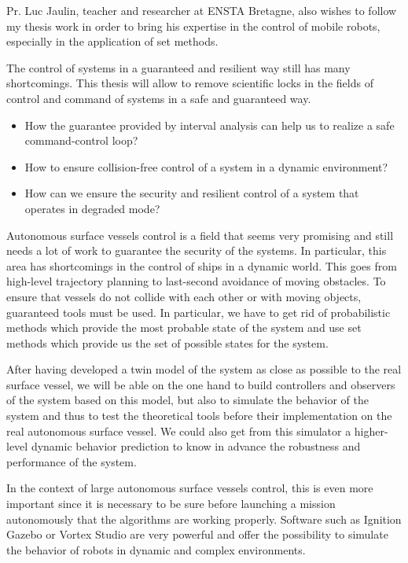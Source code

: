 \documentclass[11pt, a4paper]{awesome-cv}
\begin{document}
\begin{cvletter}
			Pr. Luc Jaulin, teacher and researcher at ENSTA Bretagne, also wishes to follow my thesis work in order to bring his expertise in the control of mobile robots, especially in the application of set methods. 
			

			The control of systems in a guaranteed and resilient way still has many shortcomings. This thesis will allow to remove scientific locks in the fields of control and command of systems in a safe and guaranteed way.

			\begin{itemize}[noitemsep,topsep=0pt,parsep=0pt,partopsep=0pt]
				\item How the guarantee provided by interval analysis can help us to realize a safe command-control loop?
				\item How to ensure collision-free control of a system in a dynamic environment?
				\item How can we ensure the security and resilient control of a system that operates in degraded mode?
			\end{itemize}


			Autonomous surface vessels control is a field that seems very promising and still needs a lot of work to guarantee the security of the systems. In particular, this area has shortcomings in the control of ships in a dynamic world. This goes from high-level trajectory planning to last-second avoidance of moving obstacles. To ensure that vessels do not collide with each other or with moving objects, guaranteed tools must be used. In particular, we have to get rid of probabilistic methods which provide the most probable state of the system and use set methods which provide us the set of possible states for the system. 

			After having developed a twin model of the system as close as possible to the real surface vessel, we will be able on the one hand to build controllers and observers of the system based on this model, but also to simulate the behavior of the system and thus to test the theoretical tools before their implementation on the real autonomous surface vessel. We could also get from this simulator a higher-level dynamic behavior prediction to know in advance the robustness and performance of the system.
			
			In the context of large autonomous surface vessels control, this is even more important since it is necessary to be sure before launching a mission autonomously that the algorithms are working properly. Software such as Ignition Gazebo or Vortex Studio are very powerful and offer the possibility to simulate the behavior of robots in dynamic and complex environments.
			

\end{cvletter}
\end{document}
